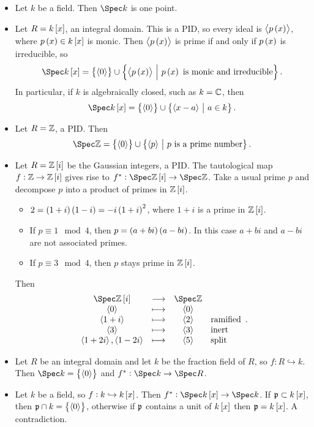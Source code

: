 \begin{example*}
\hfill
\begin{itemize}
\item Let $ k $ be a field. Then $ \Spec k $ is one point.
\item Let $ R = k\sbr{x} $, an integral domain. This is a PID, so every ideal is $ \abr{p\br{x}} $, where $ p\br{x} \in k\sbr{x} $ is monic. Then $ \abr{p\br{x}} $ is prime if and only if $ p\br{x} $ is irreducible, so
$$ \Spec k\sbr{x} = \cbr{\abr{0}} \cup \cbr{\abr{p\br{x}} \st p\br{x} \ \text{is monic and irreducible}}. $$
In particular, if $ k $ is algebraically closed, such as $ k = \mathbb{C} $, then
$$ \Spec k\sbr{x} = \cbr{\abr{0}} \cup \cbr{\abr{x - a} \st a \in k}. $$
\item Let $ R = \mathbb{Z} $, a PID. Then
$$ \Spec \ZZ = \cbr{\abr{0}} \cup \cbr{\abr{p} \st p \ \text{is a prime number}}. $$
\item Let $ R = \ZZ\sbr{i} $ be the Gaussian integers, a PID. The tautological map $ f : \ZZ \to \ZZ\sbr{i} $ gives rise to $ f^* : \Spec \ZZ\sbr{i} \to \Spec \ZZ $. Take a usual prime $ p $ and decompose $ p $ into a product of primes in $ \ZZ\sbr{i} $.
\begin{itemize}
\item $ 2 = \br{1 + i}\br{1 - i} = -i\br{1 + i}^2 $, where $ 1 + i $ is a prime in $ \ZZ\sbr{i} $.
\item If $ p \equiv 1 \mod 4 $, then $ p = \br{a + bi}\br{a - bi} $. In this case $ a + bi $ and $ a - bi $ are not associated primes.
\item If $ p \equiv 3 \mod 4 $, then $ p $ stays prime in $ \ZZ\sbr{i} $.
\end{itemize}
Then
$$
\begin{array}{cccl}
\Spec \ZZ\sbr{i} & \longrightarrow & \Spec \ZZ & \\
\abr{0} & \longmapsto & \abr{0} & \\
\abr{1 + i} & \longmapsto & \abr{2} & \text{ramified} \\
\abr{3} & \longmapsto & \abr{3} & \text{inert} \\
\abr{1 + 2i}, \abr{1 - 2i} & \longmapsto & \abr{5} & \text{split}
\end{array}.
$$
\item Let $ R $ be an integral domain and let $ k $ be the fraction field of $ R $, so $ f : R \hookrightarrow k $. Then $ \Spec k = \cbr{\abr{0}} $ and $ f^* : \Spec k \to \Spec R $.
\item Let $ k $ be a field, so $ f : k \hookrightarrow k\sbr{x} $. Then $ f^* : \Spec k\sbr{x} \to \Spec k $. If $ \ppp \subset k\sbr{x} $, then $ \ppp \cap k = \cbr{\abr{0}} $, otherwise if $ \mathfrak{p} $ contains a unit of $ k\sbr{x} $ then $ \ppp = k\sbr{x} $. A contradiction.
\end{itemize}
\end{example*}

